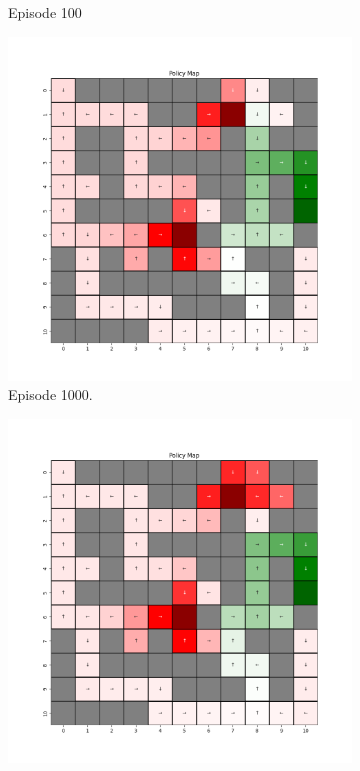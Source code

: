\documentclass{assignment}
\begin{document}
\begin{figure}[H]
\begin{subfigure}{0.3\textwidth}
    \caption{Episode 100}
    \end{subfigure}
    \begin{subfigure}{0.3\textwidth}
        \includegraphics[width=\textwidth]{figures/policy_td/epsilon_sweep/policy_alpha_0.1_gamma_0.95_epsilon_0.5_iteration_1000.png}
    \caption{Episode 1000.}
    \end{subfigure}\hfill
    \begin{subfigure}{0.3\textwidth}
        \includegraphics[width=\textwidth]{figures/policy_td/epsilon_sweep/policy_alpha_0.1_gamma_0.95_epsilon_0.5_iteration_5000.png}

\end{subfigure}
\end{figure}
\end{document}
